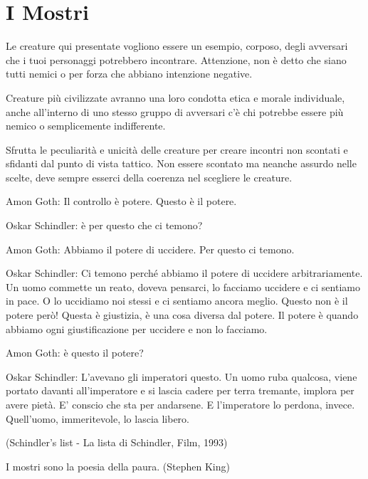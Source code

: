\section{I Mostri}

\begin{narratore}[Un pò di mostri...]
Le creature qui presentate vogliono essere un esempio, corposo, degli avversari che i tuoi personaggi potrebbero incontrare. Attenzione, non è detto che siano tutti nemici o per forza che abbiano intenzione negative.

Creature più civilizzate avranno una loro condotta etica e morale individuale, anche all'interno di uno stesso gruppo di avversari c'è chi potrebbe essere più nemico o semplicemente indifferente.

Sfrutta le peculiarità e unicità delle creature per creare incontri non scontati e sfidanti dal punto di vista tattico. Non essere scontato ma neanche assurdo nelle scelte, deve sempre esserci della coerenza nel scegliere le creature.
\end{narratore}

\bigskip

\begin{enfasi}{

Amon Goth: Il controllo è potere. Questo è il potere.

Oskar Schindler: è per questo che ci temono?

Amon Goth: Abbiamo il potere di uccidere. Per questo ci temono.

Oskar Schindler: Ci temono perché abbiamo il potere di uccidere arbitrariamente. Un uomo commette un reato, doveva pensarci, lo facciamo uccidere e ci sentiamo in pace. O lo uccidiamo noi stessi e ci sentiamo ancora meglio. Questo non è il potere però! Questa è giustizia, è una cosa diversa dal potere. Il potere è quando abbiamo ogni giustificazione per uccidere e non lo facciamo.

Amon Goth: è questo il potere?

Oskar Schindler: L'avevano gli imperatori questo. Un uomo ruba qualcosa, viene portato davanti all'imperatore e si lascia cadere per terra tremante, implora per avere pietà. E' conscio che sta per andarsene. E l'imperatore lo perdona, invece. Quell'uomo, immeritevole, lo lascia libero.

(Schindler's list - La lista di Schindler, Film, 1993)

\medskip

I mostri sono la poesia della paura. (Stephen King)
}\end{enfasi}

